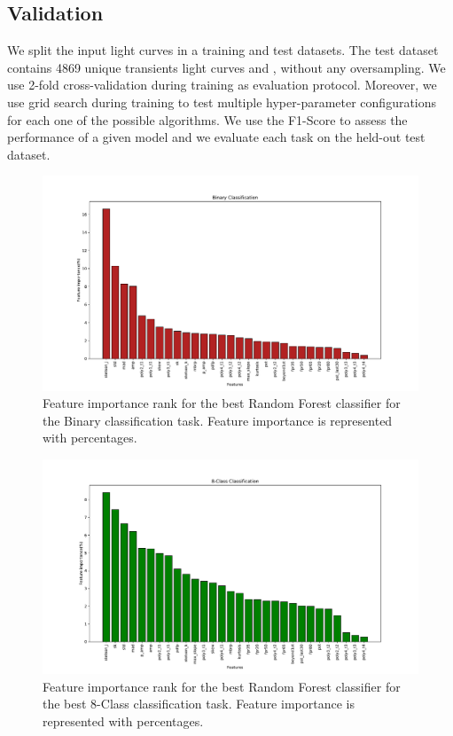 \documentclass[a4paper,fleqn,usenatbib]{mnras}
\begin{document}
\subsection{Validation} \label{subsection_importances}

We split the input light curves in a training and test datasets. 
The test dataset contains 4869 unique transients light curves and , without any
oversampling. 
We use 2-fold cross-validation during training as evaluation
protocol. 
Moreover, we use grid search during training to test multiple
hyper-parameter configurations for each one  of the possible
algorithms. 
We use the F1-Score to assess the performance of a given model and 
we evaluate each task on the held-out test dataset.

\begin{figure}
	\includegraphics[width=\textwidth]{binFeatImportance.pdf}
    \caption{Feature importance rank  for the best Random Forest
      classifier for the Binary classification task. 
      Feature importance is represented with percentages.} 
    \label{Importances-Binary}
\end{figure} 

\begin{figure}
	\includegraphics[width=\textwidth]{8classFeatImportance.pdf}
    \caption{Feature importance rank for the best Random Forest
      classifier for the best 8-Class classification task. Feature
      importance is represented with percentages.} 
    \label{Importances-8-Class}
\end{figure}
\end{document}
